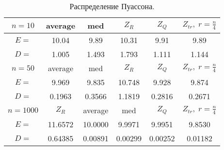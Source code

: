 \documentclass[a4]{article}
\begin{document}
			\begin{table}[h]
				\caption{ Распределение Пуассона.}
				\begin{center}
					\begin{tabular}{|c|c|c|c|c|c|}
						\hline
						$n = 10$   & average & med & $Z_R$ & $Z_Q$ & $Z_{tr},\;r=\frac{n}{4}$\\ \hline
						$E =$     & 10.04     &   9.89        & 10.31     &   9.91      &   9.89 \\ \hline
						$D =$     &  	1.005   &      1.493  &       1.793      &   1.111      &   1.144\\ \hline
						
						$n = 50$   & average & med & $Z_R$ & $Z_Q$ & $Z_{tr},\;r=\frac{n}{4}$\\ \hline
						$E =$      & 	9.969     &    9.835  &       10.748     &   9.928     &    9.874    \\ \hline
						$D =$       &	0.1963     &   0.3566   &      1.1819      &   0.2816      &   0.2671  \\ \hline
						
						$n = 1000$  & $Z_R$ & average & med  & $Z_Q$ & $Z_{tr},\;r=\frac{n}{4}$\\ \hline
						$E =$    &    11.6572  & 10.0000  &      9.9971         &    9.9951  &       9.8530\\ \hline
						$D =$    &       0.64385  & 	0.00891   &      0.00299        &   0.00252      &   0.01182  \\
						\hline
					\end{tabular}
				\end{center}
			\end{table}
			\newpage
			
\end{document}
